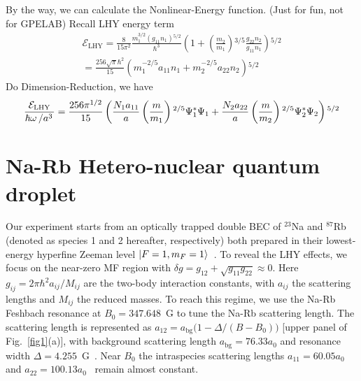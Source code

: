 By the way, we can calculate the Nonlinear-Energy function. (Just for fun, not for GPELAB)
Recall LHY energy term
\begin{equation}
\begin{split}
\mathcal{E}_{\text{LHY}}=\frac{8}{15\pi ^2}\frac{m_1^{3/2}\left(g_{11}n_1\right){}^{5/2}}{\hbar ^3}\left(1+\left(\frac{m_2}{m_1}\right){}^{3/5}\frac{g_{22}n_2}{g_{11}n_1}\right){}^{5/2}\\
=\frac{256\sqrt{\pi }\hbar ^2}{15}\left(m_1^{-2/5}a_{11}n_1+m_2^{-2/5}a_{22}n_2\right){}^{5/2}
\end{split}
\end{equation}
Do Dimension-Reduction, we have
\begin{equation}
\frac{\mathcal{E}_{\text{LHY}}}{\hbar\omega\left/a^3\right.}=\frac{256\pi^{1/2}}{15}\left(\frac{N_1a_{11}}{a}\left(\frac{m}{m_1}\right){}^{2/5}\Psi_1^*\Psi_1+\frac{N_2a_{22}}{a}\left(\frac{m}{m_2}\right){}^{2/5}\Psi _2^*\Psi _2\right){}^{5/2}
\end{equation}

\section{Na-Rb Hetero-nuclear quantum droplet}
\label{sec:droplet_experiment}

Our experiment starts from an optically trapped double BEC of $^{23}$Na and $^{87}$Rb (denoted as species 1 and 2 hereafter, respectively) both prepared in their lowest-energy hyperfine Zeeman level $\ket{F = 1, m_F = 1}$~\cite{wang2015double}. To reveal the LHY effects, we focus on the near-zero MF region with $\delta g = g_{12} + \sqrt{g_{11} g_{22}} \approx 0$. Here $g_{ij} = 2\pi\hbar^2 a_{ij}/M_{ij}$ are the two-body interaction constants, with $a_{ij}$ the scattering lengths and $M_{ij}$ the reduced masses. To reach this regime, we use the Na-Rb Feshbach resonance at $B_0 = 347.648$~G to tune the Na-Rb scattering length. The scattering length is represented as $a_{12} = a_\text{bg}\big(1-\Delta/(B-B_0)\big)$ [upper panel of Fig.~\ref{fig1}(a)], with background scattering length $a_\text{bg} = 76.33a_0$ and resonance width $\Delta = 4.255$~G~\cite{Wang2013,note1}. Near $B_0$ the intraspecies scattering lengths $a_{11} = 60.05a_0$~\cite{Knoop2011,SM} and $a_{22} = 100.13a_0$~\cite{Kempen2002,SM} remain almost constant. 

